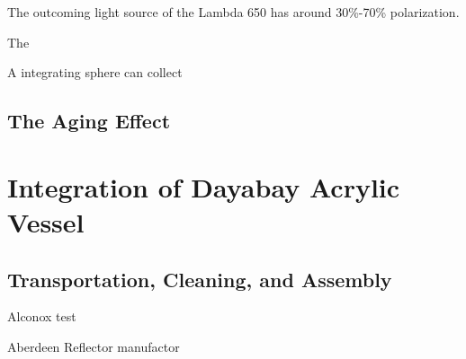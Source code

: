The outcoming light source of the Lambda 650 has around 30\%-70\% polarization.

The

A integrating sphere can collect


\subsection {The Aging Effect}


\section {Integration of Dayabay Acrylic Vessel}

\subsection {Transportation, Cleaning, and Assembly}

Alconox test

Aberdeen Reflector manufactor
